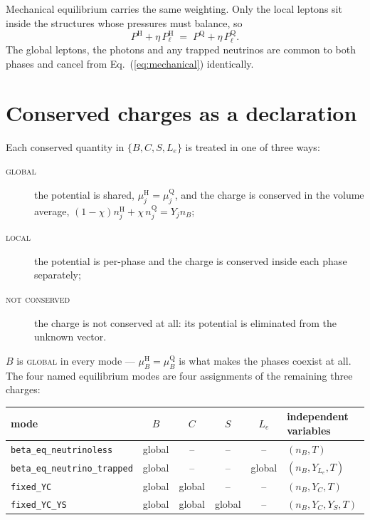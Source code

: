 \documentclass[aps,prc,onecolumn,superscriptaddress,nofootinbib,10pt]{revtex4-2}
\newcommand{\nB}{n_B}
\newcommand{\muB}{\mu_B}
\newcommand{\phH}{\mathrm{H}}
\newcommand{\phQ}{\mathrm{Q}}
\begin{document}
Mechanical equilibrium carries the same weighting. Only the local leptons sit
inside the structures whose pressures must balance, so
%
\begin{equation}
P^\phH + \eta\, P_\ell^\phH \;=\; P^\phQ + \eta\, P_\ell^\phQ .
\label{eq:mechanical}
\end{equation}
%
The global leptons, the photons and any trapped neutrinos are common to both
phases and cancel from Eq.~(\ref{eq:mechanical}) identically.

\section{Conserved charges as a declaration}

Each conserved quantity in $\{B, C, S, L_e\}$ is treated in one of three ways:

\begin{description}
\item[\textsc{global}] the potential is shared, $\mu_j^\phH = \mu_j^\phQ$,
  and the charge is conserved in the volume average,
  $(1-\chi) n_j^\phH + \chi\, n_j^\phQ = Y_j \nB$;
\item[\textsc{local}] the potential is per-phase and the charge is conserved
  inside each phase separately;
\item[\textsc{not conserved}] the charge is not conserved at all: its
  potential is eliminated from the unknown vector.
\end{description}

$B$ is \textsc{global} in every mode --- $\muB^\phH = \muB^\phQ$ is what makes
the phases coexist at all. The four named equilibrium modes are four
assignments of the remaining three charges:

\begin{center}
\begin{tabular}{lccccl}
\toprule
mode & $B$ & $C$ & $S$ & $L_e$ & independent variables \\
\midrule
\texttt{beta\_eq\_neutrinoless}     & global & --     & --     & --     & $(\nB, T)$ \\
\texttt{beta\_eq\_neutrino\_trapped}& global & --     & --     & global & $(\nB, Y_{L_e}, T)$ \\
\texttt{fixed\_YC}                  & global & global & --     & --     & $(\nB, Y_C, T)$ \\
\texttt{fixed\_YC\_YS}              & global & global & global & --     & $(\nB, Y_C, Y_S, T)$ \\
\bottomrule
\end{tabular}
\end{center}
\end{document}
